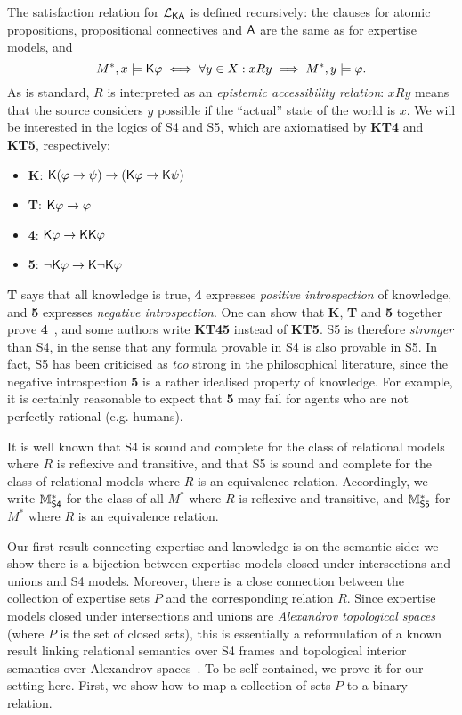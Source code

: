 The satisfaction relation for $\mathcal{L}_{\mathsf{K}\mathsf{A}}$ is defined recursively: the clauses
for atomic propositions, propositional connectives and $\mathsf{A}$ are the same
as for expertise models, and
\[
    M^*, x \models \mathsf{K}\varphi
    \iff
    \forall y \in X: xRy \implies M^*, y \models \varphi.
\]
As is standard, $R$ is interpreted as an \emph{epistemic accessibility relation}:
$xRy$ means that the source considers $y$ possible if the ``actual''
state of the world is $x$. We will be interested in the logics of S4 and
S5, which are axiomatised by \textbf{KT4} and \textbf{KT5}, respectively:

\begin{itemize}
    \item \textbf{K}: $\mathsf{K}(\varphi \rightarrow \psi) \rightarrow (\mathsf{K}\varphi \rightarrow
          \mathsf{K}\psi)$

    \item \textbf{T}: $\mathsf{K}\varphi \rightarrow \varphi$

    \item \textbf{4}: $\mathsf{K}\varphi \rightarrow \mathsf{K}\mathsf{K}\varphi$

    \item \textbf{5}: $\neg\mathsf{K}\varphi \rightarrow \mathsf{K}\neg\mathsf{K}\varphi$

\end{itemize}

\textbf{T} says that all knowledge is true, \textbf{4} expresses \emph{positive
introspection} of knowledge, and \textbf{5} expresses \emph{negative
introspection}. One can show that \textbf{K}, \textbf{T} and \textbf{5}
together prove \textbf{4}~\cite[p. 51]{zach2019}, and some authors write
\textbf{KT45} instead of \textbf{KT5}. S5 is therefore \emph{stronger} than S4,
in the sense that any formula provable in S4 is also provable in S5. In fact,
S5 has been criticised as \emph{too} strong in the philosophical literature,
since the negative introspection \textbf{5} is a rather idealised property of
knowledge. For example, it is certainly reasonable to expect that \textbf{5}
may fail for agents who are not perfectly rational (e.g. humans).

It is well known that S4 is sound and complete for the class of relational
models where $R$ is reflexive and transitive, and that S5 is sound and complete
for the class of relational models where $R$ is an equivalence relation.
Accordingly, we write $\mathbb{M}^*_{\mathsf{S4}}$ for the class of all $M^*$ where $R$ is
reflexive and transitive, and $\mathbb{M}^*_{\mathsf{S5}}$ for $M^*$ where $R$ is an equivalence
relation.

Our first result connecting expertise and knowledge is on the semantic side: we
show there is a bijection between expertise models closed under intersections
and unions and S4 models. Moreover, there is a close connection between the
collection of expertise sets $P$ and the corresponding relation $R$.
Since expertise models closed under intersections and unions
are \emph{Alexandrov topological spaces} (where $P$ is the set of closed sets),
this is essentially a reformulation of a known result linking relational
semantics over S4 frames and topological interior semantics over Alexandrov
spaces~\cite{van2007modal,ozgun_evidence}.\footnotemark{} To be self-contained,
we prove it for our setting here. First, we show how to map a collection of
sets $P$ to a binary relation.

